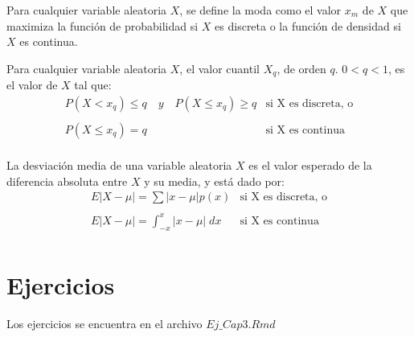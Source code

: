 \begin{tcolorbox}[colframe = white]
    \begin{def.}
	Para cualquier variable aleatoria $X$, se define la moda como el valor $x_m$ de $X$ que maximiza la función de probabilidad si $X$ es discreta o la función de densidad si $X$ es continua.
    \end{def.}
\end{tcolorbox}

\begin{tcolorbox}[colframe = white]
    \begin{def.}
	Para cualquier variable aleatoria $X$, el valor cuantil $X_q$, de orden $q$. $0<q<1$, es el valor de $X$ tal que:
	$$\begin{array}{ll}
	    P(X<x_q) \leq q \quad y \quad P(X\leq x_{q}) \geq q&\mbox{si X es discreta, o}\\\\
	    P(X\leq x_{q}) = q&\mbox{si X es continua}\\
	\end{array}$$
    \end{def.}
\end{tcolorbox}

\begin{tcolorbox}[colframe = white]
    \begin{def.}
	La desviación media de una variable aleatoria $X$ es el valor esperado de la diferencia absoluta entre $X$ y su media, y está dado por:
	$$\begin{array}{ll}
	    E|X-\mu| = \sum |x-\mu| p(x) &\mbox{si X es discreta, o}\\\\
	    E|X-\mu| = \displaystyle\int_{-x}^x |x-\mu|\; dx&\mbox{si X es continua}\\
	\end{array}$$
    \end{def.}
\end{tcolorbox}













\section{Ejercicios}

Los ejercicios se encuentra en el archivo $Ej\_Cap3.Rmd$

